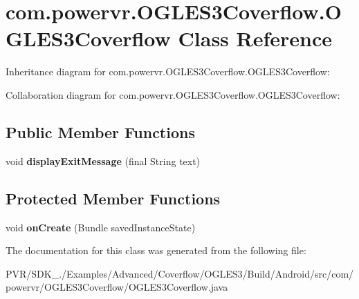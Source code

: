 \hypertarget{classcom_1_1powervr_1_1_o_g_l_e_s3_coverflow_1_1_o_g_l_e_s3_coverflow}{\section{com.\+powervr.\+O\+G\+L\+E\+S3\+Coverflow.\+O\+G\+L\+E\+S3\+Coverflow Class Reference}
\label{classcom_1_1powervr_1_1_o_g_l_e_s3_coverflow_1_1_o_g_l_e_s3_coverflow}
}


Inheritance diagram for com.\+powervr.\+O\+G\+L\+E\+S3\+Coverflow.\+O\+G\+L\+E\+S3\+Coverflow\+:


Collaboration diagram for com.\+powervr.\+O\+G\+L\+E\+S3\+Coverflow.\+O\+G\+L\+E\+S3\+Coverflow\+:
\subsection*{Public Member Functions}
\begin{DoxyCompactItemize}
\item 
\hypertarget{classcom_1_1powervr_1_1_o_g_l_e_s3_coverflow_1_1_o_g_l_e_s3_coverflow_ae609920eacd00f08769898f2cb78099b}{void {\bfseries display\+Exit\+Message} (final String text)}\label{classcom_1_1powervr_1_1_o_g_l_e_s3_coverflow_1_1_o_g_l_e_s3_coverflow_ae609920eacd00f08769898f2cb78099b}

\end{DoxyCompactItemize}
\subsection*{Protected Member Functions}
\begin{DoxyCompactItemize}
\item 
\hypertarget{classcom_1_1powervr_1_1_o_g_l_e_s3_coverflow_1_1_o_g_l_e_s3_coverflow_a7c28d4c566b5a9ddc2563bccf1e412bb}{void {\bfseries on\+Create} (Bundle saved\+Instance\+State)}\label{classcom_1_1powervr_1_1_o_g_l_e_s3_coverflow_1_1_o_g_l_e_s3_coverflow_a7c28d4c566b5a9ddc2563bccf1e412bb}

\end{DoxyCompactItemize}


The documentation for this class was generated from the following file\+:\begin{DoxyCompactItemize}
\item 
P\+V\+R/\+S\+D\+K\+\_./\+Examples/\+Advanced/\+Coverflow/\+O\+G\+L\+E\+S3/\+Build/\+Android/src/com/powervr/\+O\+G\+L\+E\+S3\+Coverflow/O\+G\+L\+E\+S3\+Coverflow.\+java\end{DoxyCompactItemize}

